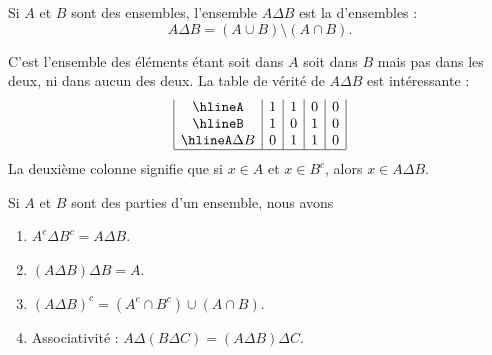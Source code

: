 \begin{definition}    \label{DefBMLooVjlSG}
    Si \( A\) et \( B\) sont des ensembles, l'ensemble \( A\Delta B\) est la  d'ensembles :
    \begin{equation}
        A\Delta B=(A\cup B)\setminus(A\cap B).
    \end{equation}
\end{definition}
C'est l'ensemble des éléments étant soit dans \( A\) soit dans \( B\) mais pas dans les deux, ni dans aucun des deux. La table de vérité de \( A\Delta B\) est intéressante :
\begin{equation}        \label{EQooOJBOooKkKbYp}
    \begin{array}{|c|c|c|c|c|}
        \hline%
        A         & 1 & 1 & 0 & 0\\
        \hline%
        B         & 1 & 0 & 1 & 0\\
        \hline%
        A\Delta B & 0 & 1 & 1 & 0\\
        \hline%
    \end{array}
\end{equation}
La deuxième colonne signifie que si \( x\in A\) et \( x\in B^c\), alors \( x\in A\Delta B\).

\begin{lemma}   \label{LemCUVoohKpWB}
    Si \( A\) et \( B\) sont des parties d'un ensemble, nous avons
    \begin{enumerate}
        \item\label{ItemVUCooHAztC}
            \( A^c\Delta B^c=A\Delta B\).
        \item\label{ItemVUCooHAztCii}
            \( (A\Delta B)\Delta B=A\).
        \item       \label{ITEMooSPZXooPTgisP}
            \( (A\Delta B)^c=(A^c\cap B^c)\cup(A\cap B)\).
        \item       \label{ITEMooSMXWooYcWsRC}
            Associativité : \( A\Delta (B\Delta C)=(A\Delta B)\Delta C\).
    \end{enumerate}
\end{lemma}

